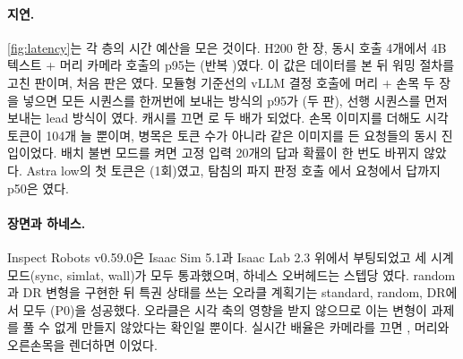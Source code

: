 \paragraph{지연.}
\cref{fig:latency}는 각 층의 시간 예산을 모은 것이다. H200 한 장, 동시 호출 4개에서 4B 텍스트 + 머리 카메라 호출의 p95는 (반복 )였다. 이 값은 데이터를 본 뒤 워밍 절차를 고친 판이며, 처음 판은 였다. 모듈형 기준선의 vLLM 결정 호출에 머리 + 손목 두 장을 넣으면 모든 시퀀스를 한꺼번에 보내는 방식의 p95가 (두 판), 선행 시퀀스를 먼저 보내는 lead 방식이 였다. 캐시를 끄면 로 두 배가 되었다. 손목 이미지를 더해도 시각 토큰이 104개 늘 뿐이며, 병목은 토큰 수가 아니라 같은 이미지를 든 요청들의 동시 진입이었다. 배치 불변 모드를 켜면 고정 입력 20개의 답과 확률이 한 번도 바뀌지 않았다. Astra low의 첫 토큰은 (1회)였고, 탐침의 파지 판정 호출 에서 요청에서 답까지 p50은 였다.



\paragraph{장면과 하네스.}
Inspect Robots v0.59.0은 Isaac Sim 5.1과 Isaac Lab 2.3 위에서 부팅되었고 세 시계 모드(sync, simlat, wall)가 모두  통과했으며, 하네스 오버헤드는 스텝당 였다. random과 DR 변형을 구현한 뒤 특권 상태를 쓰는 오라클 계획기는 standard, random, DR에서 모두 (P0)을 성공했다. 오라클은 시각 축의 영향을 받지 않으므로 이는 변형이 과제를 풀 수 없게 만들지 않았다는 확인일 뿐이다. 실시간 배율은 카메라를 끄면 , 머리와 오른손목을 렌더하면 이었다.

